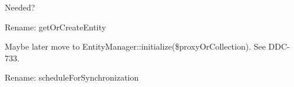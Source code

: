 \begin{DoxyRefList}
\item[Global \mbox{\hyperlink{class_doctrine_1_1_d_b_a_l_1_1_types_1_1_type_a3d0963e68bb313b163a73f2803c64600}{Type\+::get\+Name}} ()]\label{todo__todo000004}%
%
Needed?  
\item[Global \mbox{\hyperlink{class_doctrine_1_1_o_r_m_1_1_unit_of_work_a9466c36d0a529a0efe43065f1a8d845c}{Unit\+Of\+Work\+::create\+Entity}} (\$class\+Name, array \$data, \&\$hints=\mbox{[}\mbox{]})]\label{todo__todo000039}%
%
Rename\+: get\+Or\+Create\+Entity  
\item[Global \mbox{\hyperlink{class_doctrine_1_1_o_r_m_1_1_unit_of_work_ab83faee8c6f41441df1587d00cf2e48e}{Unit\+Of\+Work\+::load\+Collection}} (\mbox{\hyperlink{class_doctrine_1_1_o_r_m_1_1_persistent_collection}{Persistent\+Collection}} \$collection)]\label{todo__todo000040}%
%
Maybe later move to Entity\+Manager\+::initialize(\$proxy\+Or\+Collection). See DDC-\/733.  
\item[Global \mbox{\hyperlink{class_doctrine_1_1_o_r_m_1_1_unit_of_work_a4fbd4b082458adad1d3e2e8286fb0b9a}{Unit\+Of\+Work\+::schedule\+For\+Dirty\+Check}} (\$entity)]\label{todo__todo000041}%
%
Rename\+: schedule\+For\+Synchronization 
\end{DoxyRefList}